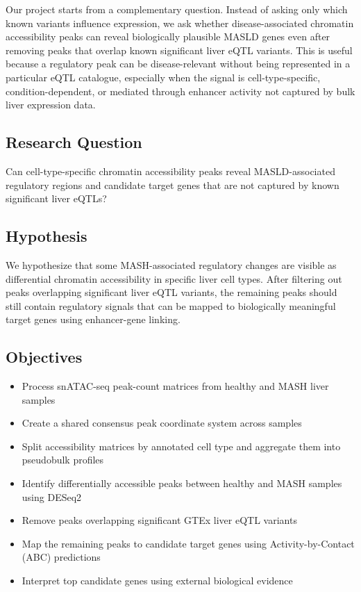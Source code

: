 \documentclass[11pt]{article}
\begin{document}
  Our project starts from a complementary question.
  Instead of asking only which known variants influence expression, we ask whether disease-associated chromatin accessibility peaks can reveal biologically plausible MASLD genes even after removing peaks that overlap known significant liver eQTL variants.
  This is useful because a regulatory peak can be disease-relevant without being represented in a particular eQTL catalogue, especially when the signal is cell-type-specific, condition-dependent, or mediated through enhancer activity not captured by bulk liver expression data.

  \subsection{Research Question}\label{subsec:research-question}
  Can cell-type-specific chromatin accessibility peaks reveal MASLD-associated regulatory regions and candidate target genes that are not captured by known significant liver eQTLs?

  \subsection{Hypothesis}\label{subsec:hypothesis}
  We hypothesize that some MASH-associated regulatory changes are visible as differential chromatin accessibility in specific liver cell types.
  After filtering out peaks overlapping significant liver eQTL variants, the remaining peaks should still contain regulatory signals that can be mapped to biologically meaningful target genes using enhancer-gene linking.

  \subsection{Objectives}\label{subsec:objectives}
  \begin{itemize}[noitemsep, topsep=0pt]
    \item Process snATAC-seq peak-count matrices from healthy and MASH liver samples
    \item Create a shared consensus peak coordinate system across samples
    \item Split accessibility matrices by annotated cell type and aggregate them into pseudobulk profiles
    \item Identify differentially accessible peaks between healthy and MASH samples using DESeq2
    \item Remove peaks overlapping significant GTEx liver eQTL variants
    \item Map the remaining peaks to candidate target genes using Activity-by-Contact (ABC) predictions
    \item Interpret top candidate genes using external biological evidence
  \end{itemize}
\end{document}
